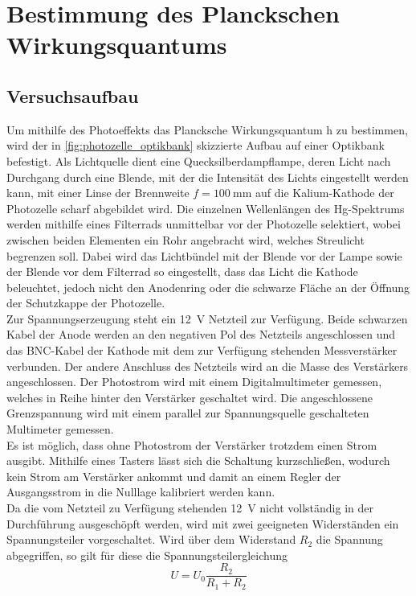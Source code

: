 \section{Bestimmung des Planckschen Wirkungsquantums}
\subsection{Versuchsaufbau}
Um mithilfe des Photoeffekts\cite[S.78-80]{Demtröder:829119} das Plancksche Wirkungsquantum h zu bestimmen, wird der
in \cref{fig:photozelle_optikbank} skizzierte Aufbau auf einer Optikbank befestigt.
Als Lichtquelle dient eine Quecksilberdampflampe, deren Licht nach Durchgang durch eine
Blende, mit der die Intensität des Lichts eingestellt werden kann,
mit einer Linse der Brennweite $f=\SI{100}{\milli\meter}$ auf die Kalium-Kathode
der Photozelle scharf abgebildet wird. Die einzelnen Wellenlängen des Hg-Spektrums
werden mithilfe eines Filterrads unmittelbar vor der Photozelle selektiert,
wobei zwischen beiden Elementen ein Rohr angebracht wird, welches Streulicht
begrenzen soll. Dabei wird das Lichtbündel mit der Blende vor der Lampe sowie der Blende vor
dem Filterrad so eingestellt, dass das Licht die Kathode beleuchtet, jedoch nicht
den Anodenring oder die schwarze Fläche an der Öffnung der Schutzkappe der Photozelle.\\

Zur Spannungserzeugung steht ein \SI{12}{\volt} Netzteil zur Verfügung. Beide schwarzen
Kabel der Anode werden an den negativen Pol des Netzteils angeschlossen und
das BNC-Kabel der Kathode mit dem zur Verfügung stehenden Messverstärker verbunden.
Der andere Anschluss des Netzteils wird an die Masse des Verstärkers angeschlossen.
Der Photostrom wird mit einem Digitalmultimeter gemessen, welches in Reihe hinter
den Verstärker geschaltet wird.
Die angeschlossene Grenzspannung wird mit einem parallel zur Spannungsquelle
geschalteten Multimeter gemessen.\\

Es ist möglich, dass ohne Photostrom der Verstärker trotzdem einen Strom ausgibt.
Mithilfe eines Tasters lässt sich die Schaltung kurzschließen, wodurch kein Strom
am Verstärker ankommt und damit an einem Regler der Ausgangsstrom in die Nulllage
kalibriert werden kann.\\

Da die vom Netzteil zu Verfügung stehenden \SI{12}{\volt} nicht vollständig in der Durchführung
ausgeschöpft werden, wird mit zwei geeigneten Widerständen ein Spannungsteiler
vorgeschaltet. Wird über dem Widerstand $R_2$ die Spannung abgegriffen, so gilt für diese
die Spannungsteilergleichung
\begin{equation}
	U = U_0\frac{R_2}{R_1 + R_2}
	\label{eq:spannungsteiler}
\end{equation}



